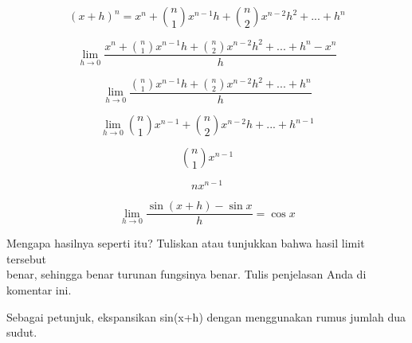 \documentclass{article}
\begin{document}
\begin{eulernotebook}
\begin{eulercomment}
\begin{eulercomment}
\begin{eulercomment}
\begin{eulercomment}
\begin{eulercomment}
\end{eulercomment}
\begin{eulerformula}
\[
(x+h)^n= x^n+\binom{n}{1}x^{n-1}h+\binom{n}{2}x^{n-2}h^2+...+h^n
\]
\end{eulerformula}
\begin{eulerformula}
\[
\lim \limits_{h \to 0} \frac{x^n+\binom{n}{1}x^{n-1}h+\binom{n}{2}x^{n-2}h^2+...+h^n-x^n}{h}
\]
\end{eulerformula}
\begin{eulerformula}
\[
\lim \limits_{h \to 0} \frac{\binom{n}{1}x^{n-1}h+\binom{n}{2}x^{n-2}h^2+...+h^n}{h}
\]
\end{eulerformula}
\begin{eulerformula}
\[
\lim \limits_{h \to 0} \binom{n}{1}x^{n-1}+\binom{n}{2}x^{n-2}h+...+h^{n-1}
\]
\end{eulerformula}
\begin{eulerformula}
\[
\binom {n}{1}x^{n-1}
\]
\end{eulerformula}
\begin{eulerformula}
\[
nx^{n-1}
\]
\end{eulerformula}
\begin{eulerformula}
\[
\lim_{h\rightarrow 0}{\frac{\sin \left(x+h\right)-\sin x}{h}}=\cos   x
\]
\end{eulerformula}
\begin{eulercomment}
Mengapa hasilnya seperti itu? Tuliskan atau tunjukkan bahwa hasil
limit tersebut\\
benar, sehingga benar turunan fungsinya benar.  Tulis penjelasan Anda
di komentar ini.

Sebagai petunjuk, ekspansikan sin(x+h) dengan menggunakan rumus jumlah
dua sudut.


\end{eulercomment}
\end{eulercomment}
\end{eulercomment}
\end{eulercomment}
\end{eulercomment}
\end{eulernotebook}
\end{document}
